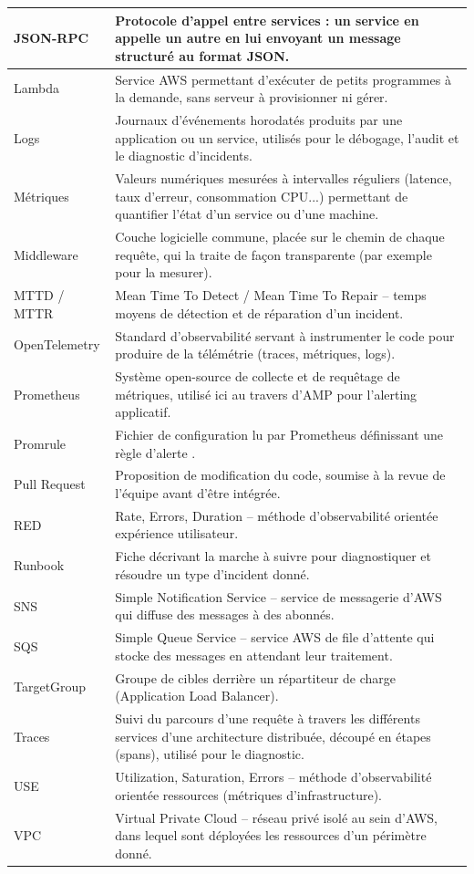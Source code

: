 \begin{longtable}{|p{}|p{}|}
		\hline
		JSON-RPC & Protocole d'appel entre services : un service en appelle un autre en lui envoyant un message structuré au format JSON. \\
		\hline
		Lambda & Service AWS permettant d'exécuter de petits programmes à la demande, sans serveur à provisionner ni gérer. \\
		\hline
		Logs & Journaux d'événements horodatés produits par une application ou un service, utilisés pour le débogage, l'audit et le diagnostic d'incidents. \\
		\hline
		Métriques & Valeurs numériques mesurées à intervalles réguliers (latence, taux d'erreur, consommation CPU...) permettant de quantifier l'état d'un service ou d'une machine. \\
		\hline
		Middleware & Couche logicielle commune, placée sur le chemin de chaque requête, qui la traite de façon transparente (par exemple pour la mesurer). \\
		\hline
		MTTD / MTTR & Mean Time To Detect / Mean Time To Repair -- temps moyens de détection et de réparation d'un incident. \\
		\hline
		OpenTelemetry & Standard d'observabilité servant à instrumenter le code pour produire de la télémétrie (traces, métriques, logs). \\
		\hline
		Prometheus & Système open-source de collecte et de requêtage de métriques, utilisé ici au travers d'AMP pour l'alerting applicatif. \\
		\hline
		Promrule & Fichier de configuration lu par Prometheus définissant une règle d'alerte . \\
		\hline
		Pull Request & Proposition de modification du code, soumise à la revue de l'équipe avant d'être intégrée. \\
		\hline
		RED & Rate, Errors, Duration -- méthode d'observabilité orientée expérience utilisateur. \\
		\hline
		Runbook & Fiche décrivant la marche à suivre pour diagnostiquer et résoudre un type d'incident donné. \\
		\hline
		SNS & Simple Notification Service -- service de messagerie d'AWS qui diffuse des messages à des abonnés. \\
		\hline
		SQS & Simple Queue Service -- service AWS de file d'attente qui stocke des messages en attendant leur traitement. \\
		\hline
		TargetGroup & Groupe de cibles derrière un répartiteur de charge (Application Load Balancer). \\
		\hline
		Traces & Suivi du parcours d'une requête à travers les différents services d'une architecture distribuée, découpé en étapes (spans), utilisé pour le diagnostic. \\
		\hline
		USE & Utilization, Saturation, Errors -- méthode d'observabilité orientée ressources (métriques d'infrastructure). \\
		\hline
		VPC & Virtual Private Cloud -- réseau privé isolé au sein d'AWS, dans lequel sont déployées les ressources d'un périmètre donné. \\
	\hline
\end{longtable}
